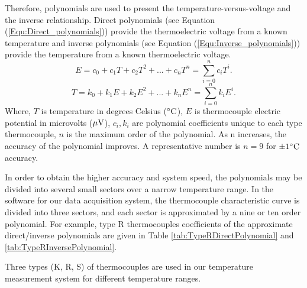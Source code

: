 Therefore, polynomials are used to present the temperature-versus-voltage and the inverse relationship.
Direct polynomials (see Equation (\ref{Equ:Direct_polynomials})) provide the thermoelectric voltage from a known temperature and inverse polynomials (see Equation (\ref{Equ:Inverse_polynomials})) provide the temperature from a known thermoelectric voltage.
\begin{equation}
\label{Equ:Direct_polynomials}
E = {c_0} + {c_1}T + {c_2}{T^2} + ... + {c_n}{T^n} = \sum\limits_{i = 0}^n {{c_i}{T^i}}.
\end{equation}
\begin{equation}
\label{Equ:Inverse_polynomials}
T = {k_0} + {k_1}E + {k_2}{E^2} + ... + {k_n}{E^n} = \sum\limits_{i = 0}^n {{k_i}{E^i}}.
\end{equation}
Where, $T$ is temperature in degrees Celsius ($^{\circ} \rm{C}$), $E$ is thermocouple electric potential in microvolts (${\rm{\mu V}}$), $c_i,k_i$ are polynomial coefficients unique to each type thermocouple, $n$ is the maximum order of the polynomial.
As n increases, the accuracy of the polynomial improves.
A representative number is $n = 9$ for $\pm 1 ^{\circ} \rm{C}$ accuracy.

In order to obtain the higher accuracy and system speed, the polynomials may be divided into several small sectors over a narrow temperature range.
In the software for our data acquisition system, the thermocouple characteristic curve is divided into three sectors, and each sector is approximated by a nine or ten order
polynomial.
For example, type R thermocouples coefficients of the approximate direct/inverse polynomials are given in Table \ref{tab:TypeRDirectPolynomial} and \ref{tab:TypeRInversePolynomial}.

Three types (K, R, S) of thermocouples are used in our temperature measurement system for different temperature ranges.



